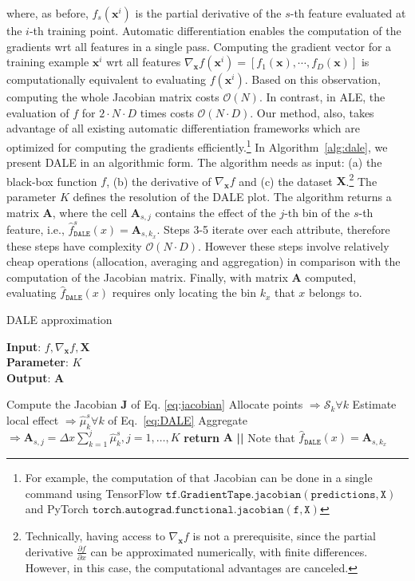 \documentclass[wcp]{jmlr}
\newcommand{\dale}{\hat{f}_{\mathtt{DALE}}}
\newcommand{\xb}{\mathbf{x}}
\newcommand{\Jac}{\mathbf{J}}
\begin{document}
\noindent
where, as before, \( f_s(\xb^i) \) is the partial derivative of the
\(s\)-th feature evaluated at the \(i\)-th training point. Automatic
differentiation enables the computation of the gradients wrt all
features in a single pass. Computing the gradient vector for a
training example \(\xb^i\) wrt all features
\( \nabla_{\xb}f(\xb^i) = [f_1(\xb), \cdots, f_D(\xb)] \) is
computationally equivalent to evaluating \(f(\xb^i)\). Based on this
observation, computing the whole Jacobian matrix costs
\(\mathcal{O}(N)\). In contrast, in ALE, the evaluation of \(f\) for
\(2 \cdot N \cdot D\) times costs \(\mathcal{O}(N \cdot D)\). Our
method, also, takes advantage of all existing automatic
differentiation frameworks which are optimized for computing the
gradients efficiently.\footnote{For example, the computation of that
  Jacobian can be done in a single command using TensorFlow
  \( \mathtt{tf.GradientTape.jacobian(predictions, X)} \) and PyTorch
  \( \mathtt{torch.autograd.functional.jacobian(f, X)} \)} In
Algorithm~\ref{alg:dale}, we present DALE in an algorithmic form. The
algorithm needs as input: (a) the black-box function \(f\), (b) the
derivative of \(\nabla_{\mathbf{x}} f \) and (c) the dataset
\( \mathbf{X} \).\footnote{Technically, having access to
  \(\nabla_{\mathbf{x}} f \) is not a prerequisite, since the partial
  derivative \(\frac{\partial f}{\partial x}\) can be approximated
  numerically, with finite differences. However, in this case, the
  computational advantages are canceled.} The parameter \( K \)
defines the resolution of the DALE plot. The algorithm returns a
matrix \(\mathbf{A}\), where the cell \(\mathbf{A}_{s,j}\) contains
the effect of the \(j\)-th bin of the \(s\)-th feature, i.e.,
\(\dale^s(x) = \mathbf{A}_{s,k_x} \). Steps 3-5 iterate
over each attribute, therefore these steps have complexity
\(\mathcal{O}(N \cdot D)\). However these steps involve relatively
cheap operations (allocation, averaging and aggregation) in comparison
with the computation of the Jacobian matrix. Finally, with matrix
\(\mathbf{A}\) computed, evaluating \(\dale(x)\) requires
only locating the bin \(k_x\) that \( x \) belongs to.

\begin{algorithm}[h]
\caption{DALE approximation}
\label{alg:dale}
\textbf{Input}: \( f, \nabla_{\mathbf{x}} f, \mathbf{X} \) \\
\textbf{Parameter}: \( K \) \\
\textbf{Output}: \(\mathbf{A}\)
\begin{algorithmic}[1] %
\STATE Compute the Jacobian \(\Jac\) of Eq. \eqref{eq:jacobian}
\STATE Allocate points \( \Rightarrow \mathcal{S}_k \forall k \)
\STATE Estimate local effect \( \Rightarrow \hat{\mu}_k^s \forall k\) of Eq.~\eqref{eq:DALE}
\STATE Aggregate \( \Rightarrow \mathbf{A}_{s,j} = \Delta x\sum_{k=1}^{j} \hat{\mu}_k^s, j =  1, \ldots, K \)
\ENDFOR
\STATE \textbf{return} \(\mathbf{A}\) \textbf{||} Note that \( \dale(x) = \mathbf{A}_{s,k_x} \)
\end{algorithmic}
\end{algorithm}
\end{document}
